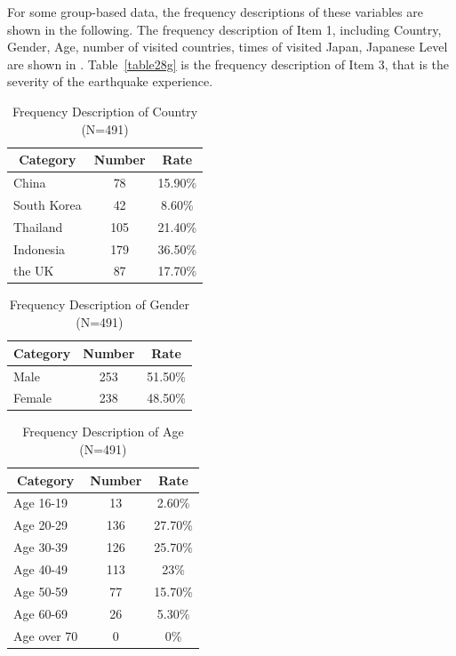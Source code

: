 For some group-based data, the frequency descriptions of these variables are shown in the following. The frequency description of Item 1, including Country, Gender, Age, number of visited countries, times of visited Japan, Japanese Level are shown in . Table~\ref{table28g} is the frequency description of Item 3, that is the severity of the earthquake experience.
\begin{table}[h]
  \caption[Frequency Description of Country]{Frequency Description of Country (N=491)}
  \label{table28a}
  \centering
  \begin{tabular}{l|cc}
 \hline
\multicolumn{1}{c|}{Category}&Number&Rate\\
 \hline
China&78&15.90\%\\
South Korea&42&8.60\%\\
Thailand&105&21.40\%\\
Indonesia&179&36.50\%\\
the UK&87&17.70\%\\
 \hline
  \end{tabular}
\end{table}

\begin{table}[h]
  \caption[Frequency Description of Gender]{Frequency Description of Gender (N=491)}
  \label{table28b}
  \centering
  \begin{tabular}{l|cc}
 \hline
\multicolumn{1}{c|}{Category}&Number&Rate\\
 \hline
Male   & 253 & 51.50\% \\
Female & 238 & 48.50\% \\
 \hline
  \end{tabular}
\end{table}

\begin{table}[h]
  \caption[Frequency Description of Age]{Frequency Description of Age (N=491)}
  \label{table28c}
  \centering
  \begin{tabular}{l|cc}
 \hline
\multicolumn{1}{c|}{Category}&Number&Rate\\
 \hline
Age 16-19   & 13  & 2.60\%  \\
Age 20-29   & 136 & 27.70\% \\
Age 30-39   & 126 & 25.70\% \\
Age 40-49   & 113 & 23\%    \\
Age 50-59   & 77  & 15.70\% \\
Age 60-69   & 26  & 5.30\%  \\
Age over 70 & 0   & 0\% \\
 \hline
  \end{tabular}
\end{table}


